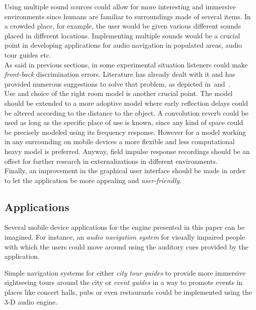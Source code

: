 \documentclass[journal]{IEEEtran}
\begin{document}
Using multiple sound sources could allow for more interesting and immersive environments since humans are familiar to surroundings made of several items. In a crowded place, for example, the user would be given various different sounds placed in different locations. Implementing multiple sounds would be a crucial point in developing applications for audio navigation in populated areas, audio tour guides etc.\\
As said in previous sections, in some experimental situation listeners could make \emph{front-back} discrimination errors. Literature has already dealt with it and has provided numerous suggestions to solve that problem, as depicted in~\cite{blum2012}and~\cite{wightman1999}.\\
Use and choice of the right room model is another crucial point. The model should be extended to a more adoptive model where early reflection delays could be altered according to the distance to the object. A convolution reverb could be used as long as the specific place of use is known, since any kind of space could be precisely modeled using its frequency response. However for a model working in any surrounding on mobile devices a more flexible and less computational heavy model is preferred. Anyway, field impulse response recordings should be an offset for further research in externalizations in different environments.\\
Finally, an improvement in the graphical user interface should be made in order to let the application be more appealing and \emph{user-friendly}.

\subsection{Applications}
Several mobile device applications for the engine presented in this paper can be imagined. For instance, an \textit{audio navigation system} for visually impaired people with which the users could move around using the auditory cues provided by the application.

Simple navigation systems for either \textit{city tour guides} to provide more immersive sightseeing tours around the city or \textit{event guides} in a way to promote events in places like concert halls, pubs or even restaurants could be implemented using the 3-D audio engine.
\end{document}

